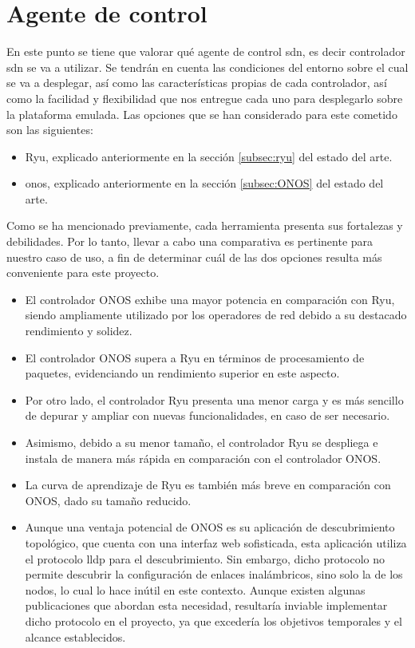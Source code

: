 \section{Agente de control }
\label{sec:ana_controller}

En este punto se tiene que valorar qué agente de control \gls{sdn}, es decir controlador \gls{sdn} se va a utilizar. Se tendrán en cuenta las condiciones del entorno sobre el cual se va a desplegar, así como las características propias de cada controlador, así como la facilidad y flexibilidad que nos entregue cada uno para desplegarlo sobre la plataforma emulada. Las opciones que se han considerado para este cometido son las siguientes:

\begin{itemize}
    \item Ryu, explicado anteriormente en la sección \ref{subsec:ryu} del estado del arte.

    \item \gls{onos}, explicado anteriormente en la sección \ref{subsec:ONOS} del estado del arte.
\end{itemize}

Como se ha mencionado previamente, cada herramienta presenta sus fortalezas y debilidades. Por lo tanto, llevar a cabo una comparativa es pertinente para nuestro caso de uso, a fin de determinar cuál de las dos opciones resulta más conveniente para este proyecto.

\begin{itemize}
    \item El controlador ONOS exhibe una mayor potencia en comparación con Ryu, siendo ampliamente utilizado por los operadores de red debido a su destacado rendimiento y solidez.
    \item El controlador ONOS supera a Ryu en términos de procesamiento de paquetes, evidenciando un rendimiento superior en este aspecto.
    \item Por otro lado, el controlador Ryu presenta una menor carga y es más sencillo de depurar y ampliar con nuevas funcionalidades, en caso de ser necesario.
    \item Asimismo, debido a su menor tamaño, el controlador Ryu se despliega e instala de manera más rápida en comparación con el controlador ONOS.
    \item La curva de aprendizaje de Ryu es también más breve en comparación con ONOS, dado su tamaño reducido.
    \item Aunque una ventaja potencial de ONOS es su aplicación de descubrimiento topológico, que cuenta con una interfaz web sofisticada, esta aplicación utiliza el protocolo \gls{lldp} para el descubrimiento. Sin embargo, dicho protocolo no permite descubrir la configuración de enlaces inalámbricos, sino solo la de los nodos, lo cual lo hace inútil en este contexto. Aunque existen algunas publicaciones que abordan esta necesidad, resultaría inviable implementar dicho protocolo en el proyecto, ya que excedería los objetivos temporales y el alcance establecidos.
\end{itemize}
